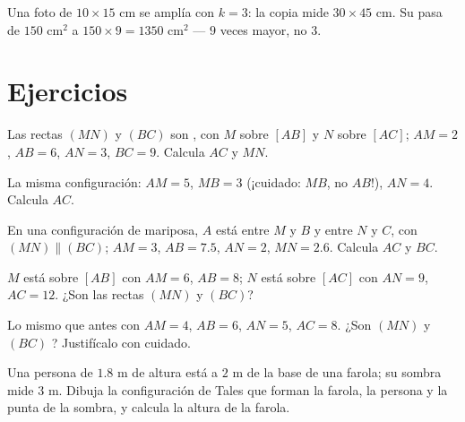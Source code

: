 \begin{example}
Una foto de $10 \times 15$ cm se amplía con  $k = 3$: la
copia mide $30 \times 45$ cm. Su  pasa de $150$ cm$^2$ a
$150 \times 9 = 1350$ cm$^2$ --- $9$ veces mayor, no $3$.
\end{example}

\section{Ejercicios}

\begin{exercise}[$\star$]\label{exo:g9:thales:1}
Las rectas $(MN)$ y $(BC)$ son , con $M$ sobre $[AB]$ y $N$ sobre
$[AC]$; $AM = 2$, $AB = 6$, $AN = 3$, $BC = 9$. Calcula $AC$ y $MN$.
\end{exercise}

\begin{exercise}[$\star$]\label{exo:g9:thales:2}
La misma configuración: $AM = 5$, $MB = 3$ (¡cuidado: $MB$, no $AB$!),
$AN = 4$. Calcula $AC$.
\end{exercise}

\begin{exercise}[$\star$]\label{exo:g9:thales:3}
En una configuración de mariposa, $A$ está entre $M$ y $B$ y entre $N$
y $C$, con $(MN) \parallel (BC)$; $AM = 3$, $AB = 7.5$, $AN = 2$,
$MN = 2.6$. Calcula $AC$ y $BC$.
\end{exercise}

\begin{exercise}[$\star$]\label{exo:g9:thales:4}
$M$ está sobre $[AB]$ con $AM = 6$, $AB = 8$; $N$ está sobre $[AC]$ con $AN = 9$,
$AC = 12$. ¿Son  las rectas $(MN)$ y $(BC)$?
\end{exercise}

\begin{exercise}[$\star\star$]\label{exo:g9:thales:5}
Lo mismo que antes con $AM = 4$, $AB = 6$, $AN = 5$, $AC = 8$. ¿Son $(MN)$
y $(BC)$ ? Justifícalo con cuidado.
\end{exercise}

\begin{exercise}[$\star\star$]\label{exo:g9:thales:6}
Una persona de $1.8$ m de altura está a $2$ m de la base de una farola;
su sombra mide $3$ m. Dibuja la configuración de Tales que forman la
farola, la persona y la punta de la sombra, y calcula la altura de
la farola.
\end{exercise}

